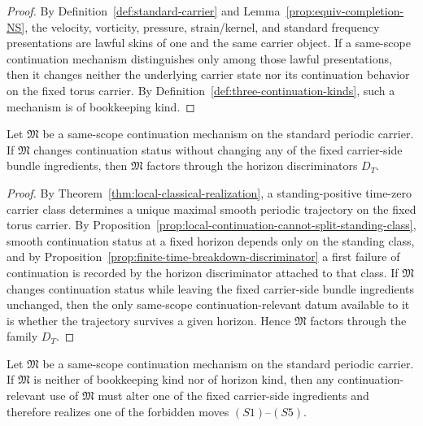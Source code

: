 \begin{proof}
By Definition~\ref{def:standard-carrier} and Lemma~\ref{prop:equiv-completion-NS}, the velocity,
vorticity, pressure, strain/kernel, and standard frequency presentations are lawful skins of one and
the same carrier object. If a same-scope continuation mechanism distinguishes only among those lawful
presentations, then it changes neither the underlying carrier state nor its continuation behavior on
the fixed torus carrier. By Definition~\ref{def:three-continuation-kinds}, such a mechanism is of
bookkeeping kind.
\end{proof}

\begin{manualproposition}
\label{prop:horizon-factorization}
Let $\mathfrak M$ be a same-scope continuation mechanism on the standard periodic carrier.
If $\mathfrak M$ changes continuation status without changing any of the fixed carrier-side bundle
ingredients, then $\mathfrak M$ factors through the horizon discriminators $D_T$.
\end{manualproposition}

\begin{proof}
By Theorem~\ref{thm:local-classical-realization}, a standing-positive time-zero carrier class determines
a unique maximal smooth periodic trajectory on the fixed torus carrier. By
Proposition~\ref{prop:local-continuation-cannot-split-standing-class}, smooth continuation status at a
fixed horizon depends only on the standing class, and by Proposition~\ref{prop:finite-time-breakdown-discriminator}
a first failure of continuation is recorded by the horizon discriminator attached to that class. If
$\mathfrak M$ changes continuation status while leaving the fixed carrier-side bundle ingredients
unchanged, then the only same-scope continuation-relevant datum available to it is whether the
trajectory survives a given horizon. Hence $\mathfrak M$ factors through the family $D_T$.
\end{proof}

\begin{manualproposition}
\label{prop:deformation-forcing}
Let $\mathfrak M$ be a same-scope continuation mechanism on the standard periodic carrier.
If $\mathfrak M$ is neither of bookkeeping kind nor of horizon kind, then any continuation-relevant
use of $\mathfrak M$ must alter one of the fixed carrier-side ingredients and therefore realizes one
of the forbidden moves $(S1)$--$(S5)$.
\end{manualproposition}

